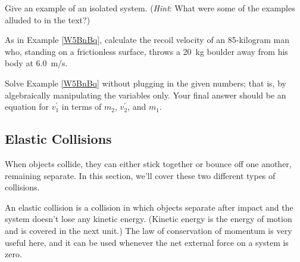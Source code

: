 \documentclass{article}
\numberwithin{equation}{section}
\numberwithin{figure}{section}
\begin{document}
\begin{exercise}
    Give an example of an isolated system. (\textit{Hint}: What were some of the examples alluded to in the text?)
\end{exercise}

\begin{exercise} \label{Fl5xyW}
    As in Example \ref{W5BnBq}, calculate the recoil velocity of an 85-kilogram man who, standing on a frictionless surface, throws a \SI{20}{kg} boulder away from his body at \SI{6.0}{m/s}.
\end{exercise}

\begin{exercise} \label{dMW612}
    Solve Example \ref{W5BnBq} without plugging in the given numbers; that is, by algebraically manipulating the variables only. Your final answer should be an equation for $v_1^{\prime}$ in terms of $m_2$, $v_2^{\prime}$, and $m_1$.
\end{exercise}



\subsection{Elastic Collisions} \label{vecM50}

When objects collide, they can either stick together or bounce off one another, remaining separate. In this section, we’ll cover these two different types of collisions.
\vspace{1em}

An \gls{elastic collision} is a collision in which objects separate after impact and the system doesn't lose any kinetic energy. (Kinetic energy is the energy of motion and is covered in the next unit.) The law of conservation of momentum is very useful here, and it can be used whenever the net external force on a system is zero. 
\vspace{1em}
\end{document}
